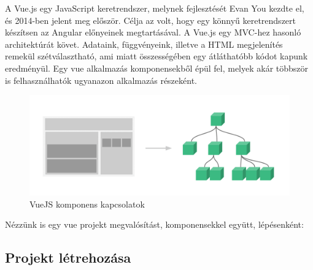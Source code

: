 

A Vue.js egy JavaScript keretrendszer, melynek fejlesztését Evan You kezdte el, és 2014-ben jelent meg először. Célja az volt, hogy egy könnyű keretrendszert készítsen az Angular előnyeinek megtartásával. A Vue.js egy MVC-hez hasonló architektúrát követ. Adataink, függvényeink, illetve a HTML megjelenítés remekül szétválasztható, ami miatt összességében egy átláthatóbb kódot kapunk eredményül. Egy vue alkalmazás komponensekből épül fel, melyek akár többször is felhasználhatók ugyanazon alkalmazás részeként.

\begin{figure}[h!]
\centering
\includegraphics[scale=0.25]{images/components.png}
\caption{VueJS komponens kapcsolatok}
\label{fig:ff}
\end{figure}

Nézzünk is egy vue projekt megvalósítást, komponensekkel együtt, lépésenként:

\subsection{Projekt létrehozása}

